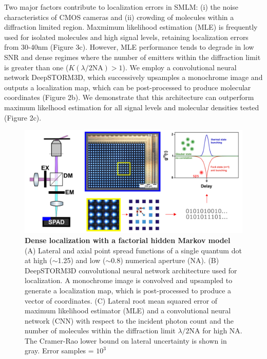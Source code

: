 \documentclass{ucetd}
\begin{document}
Two major factors contribute to localization errors in SMLM: (i) the noise characteristics of CMOS cameras and (ii) crowding of molecules within a diffraction limited region. Maxmimum likelihood estimation (MLE) is frequently used for isolated molecules and high signal levels, retaining localization errors from 30-40nm (Figure 3c). However, MLE performance tends to degrade in low SNR and dense regimes where the number of emitters within the diffraction limit is greater than one ($K(\lambda/2\mathrm{NA}) > 1$). We employ a convolutional neural network DeepSTORM3D, which successively upsamples a monochrome image and outputs a localization map, which can be post-processed to produce molecular coordinates (Figure 2b).  We demonstrate that this architecture can outperform maximum likelhood estimation for all signal levels and molecular densities tested (Figure 2c).




\begin{figure}
\begin{center}
\includegraphics[width=13cm]{Counting.png}
\end{center}
\caption{\textbf{Dense localization with a factorial hidden Markov model} (A) Lateral and axial point spread functions of a single quantum dot at high ($\sim$1.25) and low ($\sim$0.8) numerical aperture (NA). (B) DeepSTORM3D convolutional neural network architecture used for localization. A monochrome image is convolved and upsampled to generate a localization map, which is post-processed to produce a vector of coordinates. (C) Lateral root mean squared error of maximum likelihood estimator (MLE) and a convolutional neural network (CNN) with respect to the incident photon count and the number of molecules within the diffraction limit $\lambda/2\mathrm{NA}$ for high NA. The Cramer-Rao lower bound on lateral uncertainty is shown in gray. Error samples = $10^{3}$}
\end{figure}
\end{document}
